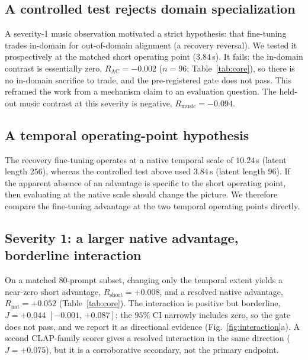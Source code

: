 \documentclass[conference]{IEEEtran}
\newcommand{\Rn}{R_{\mathrm{nat}}}
\newcommand{\Rs}{R_{\mathrm{short}}}
\newcommand{\Rm}{R_{\mathrm{music}}}
\newcommand{\ci}[2]{[{#1},\,{#2}]}
\begin{document}
\subsection{A controlled test rejects domain specialization}
A severity-1 music observation motivated a strict hypothesis: that fine-tuning trades
in-domain for out-of-domain alignment (a recovery reversal). We tested it prospectively at
the matched short operating point ($3.84$\,s). It fails: the in-domain contrast is
essentially zero, $R_{\text{AC}}=-0.002$ ($n=96$; Table~\ref{tab:core}), so there is no
in-domain sacrifice to trade, and the pre-registered gate does not pass. This reframed the
work from a mechanism claim to an evaluation question. The held-out music contrast at this
severity is negative, $\Rm=-0.094$.

\subsection{A temporal operating-point hypothesis}
The recovery fine-tuning operates at a native temporal scale of $10.24$\,s (latent length
$256$), whereas the controlled test above used $3.84$\,s (latent length $96$). If the
apparent absence of an advantage is specific to the short operating point, then evaluating
at the native scale should change the picture. We therefore compare the fine-tuning
advantage at the two temporal operating points directly.

\subsection{Severity 1: a larger native advantage, borderline interaction}
On a matched $80$-prompt subset, changing only the temporal extent yields a near-zero short
advantage, $\Rs=+0.008$, and a resolved native advantage, $\Rn=+0.052$
(Table~\ref{tab:core}). The interaction is positive but borderline,
$J=+0.044$ $\ci{-0.001}{+0.087}$: the $95\%$ CI narrowly includes zero, so the gate does not
pass, and we report it as directional evidence (Fig.~\ref{fig:interaction}a). A second
CLAP-family scorer gives a resolved interaction in the same direction ($J=+0.075$), but it is
a corroborative secondary, not the primary endpoint.
\end{document}
